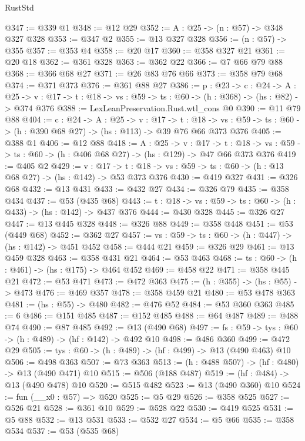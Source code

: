 \begin{lexlean}{RustStd}
\begin{coremodule}
@347 := @339 @1
@348 := @12 @29
@352 := {A : @25} -> (n : @57) -> @348 @327 @328
@353 := @347 @2
@355 := @13 @327 @328
@356 := (n : @57) -> @355
@357 := @353 @4
@358 := @20 @17
@360 := @358 @327 @21
@361 := @20 @18
@362 := @361 @328
@363 := @362 @22
@366 := @7 @66 @79 @88
@368 := @366 @68 @27
@371 := @26 @83 @76 @66
@373 := @358 @79 @68
@374 := @371 @373
@376 := @361 @88 @27
@386 := {p : @23} ->
  {c : @24} ->
  {A : @25} ->
  {v : @17} -> {t : @18} -> {vs : @59} -> {ts : @60} -> (h : @368) -> (hs : @82) -> @374 @376
@388 := LexLeanPreservation.Rust.wtl_cons @0
@390 := @11 @79 @88
@404 := {c : @24} ->
  {A : @25} ->
  {v : @17} ->
  {t : @18} ->
  {vs : @59} -> {ts : @60} -> (h : @390 @68 @27) -> (hs : @113) -> @39 @76 @66 @373 @376
@405 := @388 @1
@406 := @12 @88
@418 := {A : @25} ->
  {v : @17} ->
  {t : @18} -> {vs : @59} -> {ts : @60} -> (h : @406 @68 @27) -> (hs : @129) -> @47 @66 @373 @376
@419 := @405 @2
@429 := {v : @17} ->
  {t : @18} -> {vs : @59} -> {ts : @60} -> (h : @13 @68 @27) -> (hs : @142) -> @53 @373 @376
@430 := @419 @327
@431 := @326 @68
@432 := @13 @431
@433 := @432 @27
@434 := @326 @79
@435 := @358 @434
@437 := @53 (@435 @68)
@443 := {t : @18} -> {vs : @59} -> {ts : @60} -> (h : @433) -> (hs : @142) -> @437 @376
@444 := @430 @328
@445 := @326 @27
@447 := @13 @445 @328
@448 := @326 @88
@449 := @358 @448
@451 := @53 (@449 @68)
@452 := @362 @27
@457 := {vs : @59} -> {ts : @60} -> (h : @447) -> (hs : @142) -> @451 @452
@458 := @444 @21
@459 := @326 @29
@461 := @13 @459 @328
@463 := @358 @431 @21
@464 := @53 @463
@468 := {ts : @60} -> (h : @461) -> (hs : @175) -> @464 @452
@469 := @458 @22
@471 := @358 @445 @21
@472 := @53 @471
@473 := @472 @363
@475 := (h : @355) -> (hs : @55) -> @473
@476 := @469 @357
@478 := @358 @459 @21
@480 := @53 @478 @363
@481 := (hs : @55) -> @480
@482 := @476 @52
@484 := @53 @360 @363
@485 := 6
@486 := @151 @485
@487 := @152 @485
@488 := @64 @487
@489 := @488 @74
@490 := @87 @485
@492 := @13 (@490 @68)
@497 := {fs : @59} -> {tys : @60} -> (h : @489) -> (hf : @142) -> @492 @10
@498 := @486 @360
@499 := @472 @29
@505 := {tys : @60} -> (h : @489) -> (hf : @499) -> @13 (@490 @463) @10
@506 := @498 @363
@507 := @73 @363
@513 := (h : @488 @507) -> (hf : @480) -> @13 (@490 @471) @10
@515 := @506 (@188 @487)
@519 := (hf : @484) -> @13 (@490 @478) @10
@520 := @515 @482
@523 := @13 (@490 @360) @10
@524 := fun (__x0 : @57) => @520
@525 := @5 @29
@526 := @358 @525
@527 := @526 @21
@528 := @361 @10
@529 := @528 @22
@530 := @419 @525
@531 := @5 @88
@532 := @13 @531
@533 := @532 @27
@534 := @5 @66
@535 := @358 @534
@537 := @53 (@535 @68)

\end{coremodule}
\end{lexlean}
